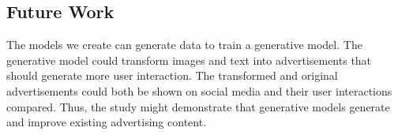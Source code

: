 \documentclass[mksc,blindrev]{informs3} %
\begin{document}
\subsection{Future Work}

The models we create can generate data to train a generative model. The generative model could transform images and text into advertisements that should generate more user interaction. The transformed and original advertisements could both be shown on social media and their user interactions compared. Thus, the study might demonstrate that generative models generate and improve existing advertising content.






%
%
%



\end{document}
